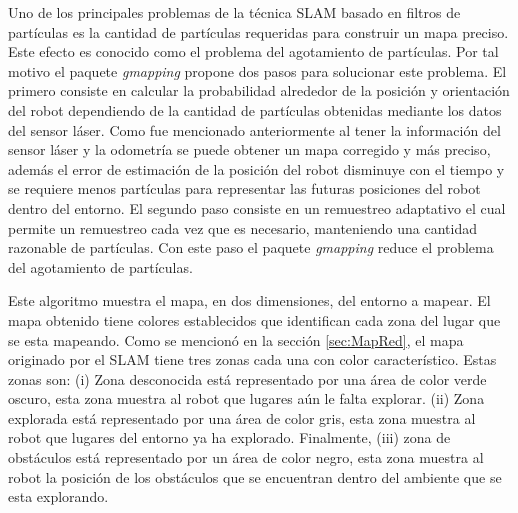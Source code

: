 Uno de los principales problemas de la técnica SLAM basado en filtros de partículas es la cantidad 
de partículas requeridas para construir un mapa preciso. Este efecto es conocido como el 
problema del agotamiento de partículas. Por tal motivo el paquete \textit{gmapping} propone 
dos pasos para solucionar este problema. El primero consiste en calcular la probabilidad 
alrededor de la posición y orientación del robot dependiendo de la cantidad de partículas 
obtenidas mediante los datos del sensor láser. Como fue mencionado anteriormente al tener 
la información del sensor láser y la odometría se puede obtener un mapa corregido y más 
preciso, además el error de estimación de la posición del robot disminuye con el tiempo y 
se requiere menos partículas para representar las futuras posiciones del robot dentro del 
entorno. El segundo paso consiste en un remuestreo adaptativo el cual permite un remuestreo 
cada vez que es necesario, manteniendo una cantidad razonable de partículas. Con este paso 
el paquete \textit{gmapping} reduce el problema del agotamiento de partículas.

Este algoritmo muestra el mapa, en dos dimensiones, del entorno a mapear. El mapa obtenido
tiene colores establecidos que identifican cada zona del lugar que se esta mapeando. Como 
se mencionó en la sección \ref{sec:MapRed}, el mapa originado por el SLAM tiene tres zonas
cada una con color característico. Estas zonas son: (i) Zona desconocida está representado 
por una área de color verde oscuro, esta zona muestra al robot que lugares aún le falta 
explorar. (ii) Zona explorada está representado por una área de color gris, esta zona 
muestra al robot que lugares del entorno ya ha explorado. Finalmente, (iii) zona de 
obstáculos está representado por un área de color negro, esta zona muestra al robot la 
posición de los obstáculos que se encuentran dentro del ambiente que se esta explorando.


